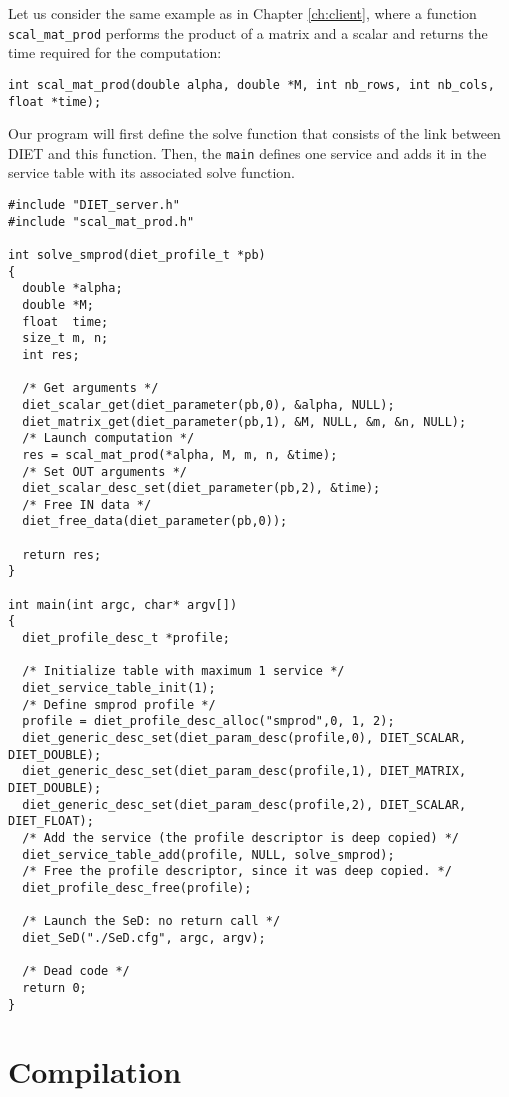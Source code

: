 {{Let us consider the same example as in Chapter \ref{ch:client}, where
a function \texttt{scal\_mat\_prod} performs the product of a matrix
and a scalar and returns the time required for the computation: {\footnotesize
\begin{verbatim}
int scal_mat_prod(double alpha, double *M, int nb_rows, int nb_cols, float *time);
\end{verbatim}
}
Our program will first define the solve function that consists of the link
between DIET and this function. Then, the \texttt{main} defines one service and
adds it in the service table with its associated solve function.
{\footnotesize
\begin{verbatim}
#include "DIET_server.h"
#include "scal_mat_prod.h"

int solve_smprod(diet_profile_t *pb)
{
  double *alpha;
  double *M;
  float  time;
  size_t m, n;
  int res;

  /* Get arguments */
  diet_scalar_get(diet_parameter(pb,0), &alpha, NULL);
  diet_matrix_get(diet_parameter(pb,1), &M, NULL, &m, &n, NULL);
  /* Launch computation */
  res = scal_mat_prod(*alpha, M, m, n, &time);
  /* Set OUT arguments */
  diet_scalar_desc_set(diet_parameter(pb,2), &time);
  /* Free IN data */
  diet_free_data(diet_parameter(pb,0));

  return res;
}

int main(int argc, char* argv[])
{
  diet_profile_desc_t *profile;
  
  /* Initialize table with maximum 1 service */
  diet_service_table_init(1);
  /* Define smprod profile */
  profile = diet_profile_desc_alloc("smprod",0, 1, 2);
  diet_generic_desc_set(diet_param_desc(profile,0), DIET_SCALAR, DIET_DOUBLE);
  diet_generic_desc_set(diet_param_desc(profile,1), DIET_MATRIX, DIET_DOUBLE);
  diet_generic_desc_set(diet_param_desc(profile,2), DIET_SCALAR, DIET_FLOAT);
  /* Add the service (the profile descriptor is deep copied) */
  diet_service_table_add(profile, NULL, solve_smprod);
  /* Free the profile descriptor, since it was deep copied. */
  diet_profile_desc_free(profile);

  /* Launch the SeD: no return call */
  diet_SeD("./SeD.cfg", argc, argv);

  /* Dead code */
  return 0;
}
\end{verbatim}
}

\section{Compilation}
\label{sec:sv_comp}

}}
